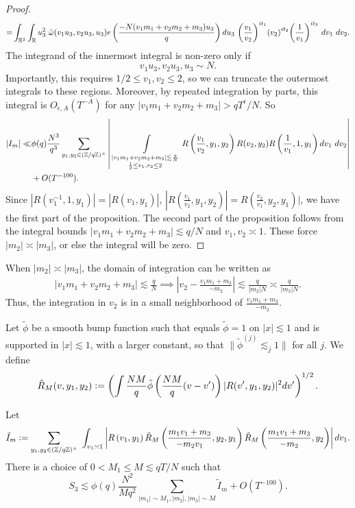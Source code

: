 \begin{proof}
\begin{align*}
    =&\int_{\reals^2}\int_\reals u_3^2 \ \tilde{\omega}(v_1u_3,v_2u_3,u_3) e\left(\frac{-N(v_1m_1+v_2m_2+m_3)u_3}{q}\right)  du_3 \ {\left(\frac{v_1}{v_2}\right)}^{it_1} {\left(v_2\right)}^{it_2}{\left(\frac{1}{v_1}\right)}^{it_3}  \ dv_1\ dv_2.\\
\end{align*}
The integrand of the innermost integral is non-zero only if \[
    v_1u_3,v_2u_3,u_3\sim N.
\]
Importantly, this requires $1/2 \leq v_1,v_2 \leq 2$, so we can truncate the outermost integrals to these regions. Moreover, by repeated integration by parts, this integral is $O_{\epsilon, A}(T^{-A})$ for any $|v_1m_1+v_2m_2+m_3|>qT^\epsilon/N$.
So 
\begin{align*}
    |I_m|\ll &\phi(q) \frac{N^3}{q^3}  
    \sum_{y_1,y_2\in (\mathbb{Z}/q\mathbb{Z})^\times}\left|\ \int\displaylimits_{\substack{
        |v_1m_1+v_2m_2+m_3|\lesssim \frac{q}{N}\\
        \frac{1}{2}\leq v_1,v_2\leq 2
    }} R\left(\frac{v_1}{v_2},y_1,y_2\right)
    R(v_2,y_2)R\left(\frac{1}{v_1},1,y_1\right) dv_1 \ dv_2 \right|\\ &+ O(T^{-100}).\\
\end{align*}
Since $|R(v_1^{-1},1,y_1)|=|R(v_1,y_1)|$, $| R\left(\frac{v_1}{v_2},y_1,y_2\right)| = R\left(\frac{v_2}{v_1},y_2,y_1\right)|$, we have the first part of the proposition.
The second part of the proposition follows from the integral bounds $|v_1m_1+v_2m_2+m_3|\lesssim q/N$
 and $v_1,v_2\asymp 1$. These force $|m_2| \asymp|m_3|$, or else the integral will be zero.

\end{proof}

When $|m_2|\asymp|m_3|$, the domain of integration can be written as\begin{align*}
    |v_1m_1+v_2m_2+m_3|\lesssim \frac{q}{N} \implies \left|v_2 - \frac{v_1m_1+m_3}{-m_2}\right|\lesssim \frac{q}{|m_2|N} \asymp \frac{q}{|m_3|N}.
\end{align*}
Thus, the integration in $v_2$ is in a small neighborhood of $\frac{v_1m_1+m_3}{-m_2}$.

Let $\tilde{\phi}$ be a smooth bump function such that equals $\tilde{\phi}=1$ on $|x|\lesssim 1$ and is supported in $|x|\lesssim 1$, with a larger constant, so that $\|\tilde{\phi}^{(j)}\lesssim_j 1\|$ for all $j$. We define \[
\tilde{R}_M(v,y_1,y_2) \mathrel{\mathop:}= \left( \int \frac{NM}{q}\tilde{\phi}\left(\frac{NM}{q}(v-v')\right)|R(v',y_1,y_2)|^2 dv'\right)^{1/2}.
\]
\begin{proposition} \label{dyadics_3}
    Let \[
    \tilde{I}_m\mathrel{\mathop:}= \sum_{y_1,y_2\in (\mathbb{Z}/q\mathbb{Z})^\times}\ \int_{v_1\asymp 1} 
         \left|R\left(v_1,y_1\right) \tilde{R}_M\left(\frac{m_1v_1+m_3}{-m_2v_1},y_2,y_1\right)
        \tilde{R}_M\left(\frac{m_1v_1+m_3}{-m_2},y_2\right)\right| dv_1.
    \]
    There is a choice of $0<M_1\leq M \lesssim qT/N$ such that \[
        S_3\lesssim \phi(q)\frac{N^2}{Mq^2}\sum_{|m_1|\sim M_1,|m_2|,|m_3|\sim M}\tilde{I}_m+O(T^{-100}).
    \]
\end{proposition}


